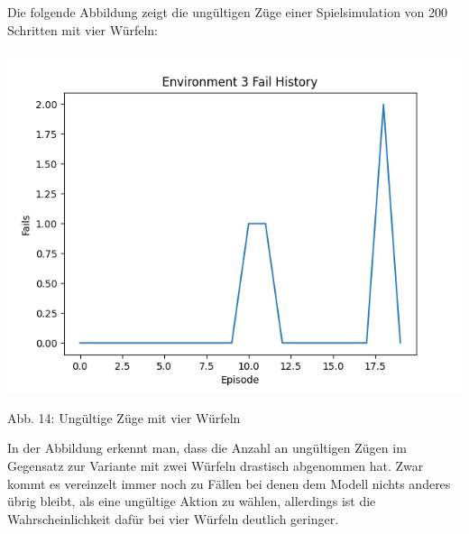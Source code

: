 \begin{minipage}{\linewidth}
Die folgende Abbildung zeigt die ungültigen Züge einer Spielsimulation von 200 Schritten mit vier Würfeln:

	\vspace{0.5cm}
	\includegraphics[width=1\textwidth]{Bilder/failswithfourdice}
	
	Abb. 14: Ungültige Züge mit vier Würfeln\\
\end{minipage}

In der Abbildung erkennt man, dass die Anzahl an ungültigen Zügen im Gegensatz zur Variante mit zwei Würfeln drastisch abgenommen hat. Zwar kommt es vereinzelt immer noch zu Fällen bei denen dem Modell nichts anderes übrig bleibt, als eine ungültige Aktion zu wählen, allerdings ist die Wahrscheinlichkeit dafür bei vier Würfeln deutlich geringer.
